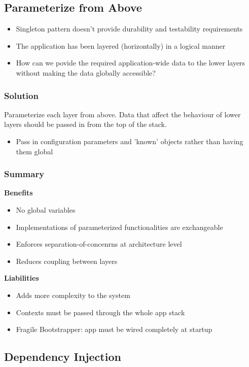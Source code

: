 \subsection{Parameterize from Above}
\begin{itemize}
    \item Singleton pattern doesn't provide durability and testability requirements
    \item The application has been layered (horizontally) in a logical manner
    \item How can we povide the required application-wide data to the lower layers without making the data globally accessible?
\end{itemize}
\subsubsection{Solution}
Parameterize each layer from above. Data that affect the behaviour of lower layers should be passed in from the top of the stack.
\begin{itemize}
    \item Pass in configuration parameters and 'known' objects rather than having them global
\end{itemize}
\subsubsection{Summary}
\textbf{Benefits}
\begin{itemize}
    \item No global variables
    \item Implementations of parameterized functionalities are exchangeable
    \item Enforces separation-of-concenrns at architecture level
    \item Reduces coupling between layers
\end{itemize}
\textbf{Liabilities}
\begin{itemize}
    \item Adds more complexity to the system
    \item Contexts must be passed through the whole app stack
    \item Fragile Bootstrapper: app must be wired completely at startup
\end{itemize}

\subsection{Dependency Injection}
